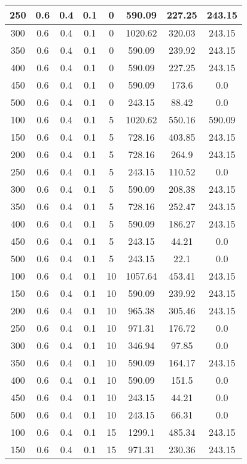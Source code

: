 \documentclass[a4paper, 12pt]{extreport}
\begin{document}
\begin{itemize}
\begin{longtable}{|c|c|c|c|c|c|c|c|}
			250 & 0.6 & 0.4 & 0.1 & 0 & 590.09 & 227.25 & 243.15 \\\hline
			300 & 0.6 & 0.4 & 0.1 & 0 & 1020.62 & 320.03 & 243.15 \\\hline
			350 & 0.6 & 0.4 & 0.1 & 0 & 590.09 & 239.92 & 243.15 \\\hline
			400 & 0.6 & 0.4 & 0.1 & 0 & 590.09 & 227.25 & 243.15 \\\hline
			450 & 0.6 & 0.4 & 0.1 & 0 & 590.09 & 173.6 & 0.0 \\\hline
			500 & 0.6 & 0.4 & 0.1 & 0 & 243.15 & 88.42 & 0.0 \\\hline
			100 & 0.6 & 0.4 & 0.1 & 5 & 1020.62 & 550.16 & 590.09 \\\hline
			150 & 0.6 & 0.4 & 0.1 & 5 & 728.16 & 403.85 & 243.15 \\\hline
			200 & 0.6 & 0.4 & 0.1 & 5 & 728.16 & 264.9 & 243.15 \\\hline
			250 & 0.6 & 0.4 & 0.1 & 5 & 243.15 & 110.52 & 0.0 \\\hline
			300 & 0.6 & 0.4 & 0.1 & 5 & 590.09 & 208.38 & 243.15 \\\hline
			350 & 0.6 & 0.4 & 0.1 & 5 & 728.16 & 252.47 & 243.15 \\\hline
			400 & 0.6 & 0.4 & 0.1 & 5 & 590.09 & 186.27 & 243.15 \\\hline
			450 & 0.6 & 0.4 & 0.1 & 5 & 243.15 & 44.21 & 0.0 \\\hline
			500 & 0.6 & 0.4 & 0.1 & 5 & 243.15 & 22.1 & 0.0 \\\hline
			100 & 0.6 & 0.4 & 0.1 & 10 & 1057.64 & 453.41 & 243.15 \\\hline
			150 & 0.6 & 0.4 & 0.1 & 10 & 590.09 & 239.92 & 243.15 \\\hline
			200 & 0.6 & 0.4 & 0.1 & 10 & 965.38 & 305.46 & 243.15 \\\hline
			250 & 0.6 & 0.4 & 0.1 & 10 & 971.31 & 176.72 & 0.0 \\\hline
			300 & 0.6 & 0.4 & 0.1 & 10 & 346.94 & 97.85 & 0.0 \\\hline
			350 & 0.6 & 0.4 & 0.1 & 10 & 590.09 & 164.17 & 243.15 \\\hline
			400 & 0.6 & 0.4 & 0.1 & 10 & 590.09 & 151.5 & 0.0 \\\hline
			450 & 0.6 & 0.4 & 0.1 & 10 & 243.15 & 44.21 & 0.0 \\\hline
			500 & 0.6 & 0.4 & 0.1 & 10 & 243.15 & 66.31 & 0.0 \\\hline
			100 & 0.6 & 0.4 & 0.1 & 15 & 1299.1 & 485.34 & 243.15 \\\hline
			150 & 0.6 & 0.4 & 0.1 & 15 & 971.31 & 230.36 & 243.15 \\\hline

\end{longtable}
\end{itemize}
\end{document}
